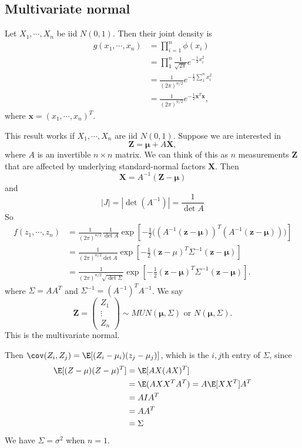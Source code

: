 \documentclass[a4paper]{article}
\begin{document}
\subsection{Multivariate normal}
Let $X_1, \cdots, X_n$ be iid $N(0, 1)$. Then their joint density is
\begin{align*}
  g(x_1, \cdots, x_n) &= \prod_{i = 1}^n \phi(x_i) \\
  &= \prod_{1}^n\frac{1}{\sqrt{2\pi}}e^{-\frac{1}{2}x_i^2}\\
  &= \frac{1}{(2\pi)^{n/2}} e^{-\frac{1}{2}\sum_1^n x_i^2}\\
  &= \frac{1}{(2\pi)^{n/2}}e^{-\frac{1}{2}\mathbf{x}^T \mathbf{x}},
\end{align*}
where $\mathbf{x} = (x_1, \cdots, x_n)^T$.

This result works if $X_1, \cdots, X_n$ are iid $N(0, 1)$. Suppose we are interested in
\[
  \mathbf{Z} = \boldsymbol\mu + A\mathbf{X},
\]
where $A$ is an invertible $n\times n$ matrix. We can think of this as $n$ measurements $\mathbf{Z}$ that are affected by underlying standard-normal factors $\mathbf{X}$. Then
\[
  \mathbf{X} = A^{-1}(\mathbf{Z} - \boldsymbol\mu)
\]
and
\[
  |J| = |\det (A^{-1})| = \frac{1}{\det A}
\]
So
\begin{align*}
  f(z_1, \cdots, z_n) &= \frac{1}{(2\pi)^{n/2}}\frac{1}{\det A}\exp\left[-\frac{1}{2}\big((A^{-1}(\mathbf{z} - \boldsymbol\mu))^T(A^{-1}(\mathbf{z} - \boldsymbol\mu))\big)\right]\\
  &= \frac{1}{(2\pi)^{n/2}\det A}\exp\left[-\frac{1}{2}(\mathbf{z} - \mu)^T \Sigma^{-1}(\mathbf{z} - \boldsymbol\mu)\right]\\
  &= \frac{1}{(2\pi)^{n/2}\sqrt{\det \Sigma}}\exp\left[-\frac{1}{2}(\mathbf{z} - \boldsymbol\mu)^T \Sigma^{-1}(\mathbf{z} - \boldsymbol\mu)\right].
\end{align*}
where $\Sigma = AA^T$ and $\Sigma^{-1} = (A^{-1})^TA^{-1}$. We say
\[
  \mathbf{Z} = 
  \begin{pmatrix}
    Z_1\\
    \vdots\\
    Z_n
  \end{pmatrix}
  \sim MUN(\boldsymbol\mu, \Sigma)\text{ or }N(\boldsymbol\mu, \Sigma).
\]
This is the multivariate normal.

Then $\cov(Z_i, Z_j) = \E[(Z_i - \mu_i)(z_j - \mu_j)]$, which is the $i, j$th entry of $\Sigma$, since
\begin{align*}
  \E[(Z - \mu)(Z - \mu)^T] &= \E[AX(AX)^T]\\
  &= \E(AXX^TA^T) = A\E[XX^T]A^T\\
  &= AIA^T\\
  &= AA^T \\
  &= \Sigma
\end{align*}
We have $\Sigma = \sigma^2$ when $n = 1$.
\end{document}
